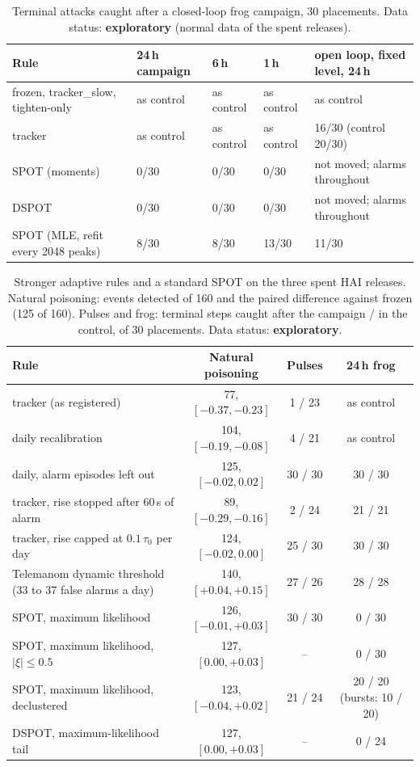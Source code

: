 \documentclass[sigconf,review,anonymous]{acmart}
\begin{document}
\begin{table}[t]
\caption{Terminal attacks caught after a closed-loop frog campaign, 30 placements. Data status:
\textbf{exploratory} (normal data of the spent releases).}
\label{tab:frog}
\begin{tabular}{@{}lllll@{}}
\toprule
Rule & 24\,h campaign & 6\,h & 1\,h & open loop, fixed level, 24\,h \\
\midrule
frozen, tracker\_slow, tighten-only & as control & as control & as control & as control \\
tracker & as control & as control & as control & 16/30 (control 20/30) \\
SPOT (moments) & 0/30 & 0/30 & 0/30 & not moved; alarms throughout \\
DSPOT & 0/30 & 0/30 & 0/30 & not moved; alarms throughout \\
SPOT (MLE, refit every 2048 peaks) & 8/30 & 8/30 & 13/30 & 11/30 \\
\bottomrule
\end{tabular}
\end{table}

\begin{table}[t]
\caption{Stronger adaptive rules and a standard SPOT on the three spent HAI releases. Natural poisoning:
events detected of 160 and the paired difference against frozen (125 of 160). Pulses and frog: terminal
steps caught after the campaign / in the control, of 30 placements. Data status: \textbf{exploratory}.}
\label{tab:stronger}
\begin{tabularx}{\textwidth}{@{}Lccc@{}}
\toprule
Rule & Natural poisoning & Pulses & 24\,h frog \\
\midrule
tracker (as registered) & 77, $[-0.37, -0.23]$ & 1 / 23 & as control \\
daily recalibration & 104, $[-0.19, -0.08]$ & 4 / 21 & as control \\
daily, alarm episodes left out & 125, $[-0.02, 0.02]$ & 30 / 30 & 30 / 30 \\
tracker, rise stopped after 60\,s of alarm & 89, $[-0.29, -0.16]$ & 2 / 24 & 21 / 21 \\
tracker, rise capped at $0.1\,\tau_0$ per day & 124, $[-0.02, 0.00]$ & 25 / 30 & 30 / 30 \\
Telemanom dynamic threshold (33 to 37 false alarms a day) & 140, $[+0.04, +0.15]$ & 27 / 26 & 28 / 28 \\
SPOT, maximum likelihood & 126, $[-0.01, +0.03]$ & 30 / 30 & 0 / 30 \\
SPOT, maximum likelihood, $|\xi| \le 0.5$ & 127, $[0.00, +0.03]$ & -- & 0 / 30 \\
SPOT, maximum likelihood, declustered & 123, $[-0.04, +0.02]$ & 21 / 24 & 20 / 20 (bursts: 10 / 20) \\
DSPOT, maximum-likelihood tail & 127, $[0.00, +0.03]$ & -- & 0 / 24 \\
\bottomrule
\end{tabularx}
\end{table}
\end{document}
